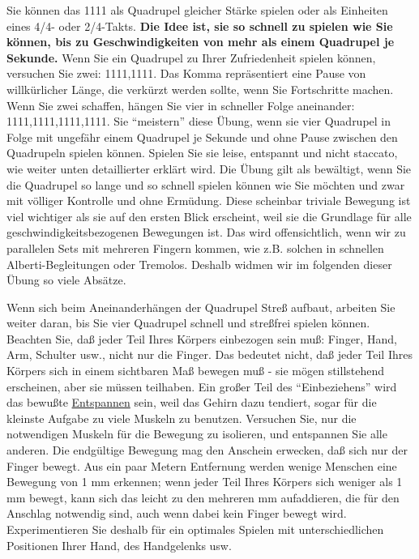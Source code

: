Sie können das 1111 als Quadrupel gleicher Stärke spielen oder als Einheiten eines 4/4- oder 2/4-Takts.
\textbf{Die Idee ist, sie so schnell zu spielen wie Sie können, bis zu Geschwindigkeiten von mehr als einem Quadrupel je Sekunde.}
Wenn Sie ein Quadrupel zu Ihrer Zufriedenheit spielen können, versuchen Sie zwei: 1111,1111.
Das Komma repräsentiert eine Pause von willkürlicher Länge, die verkürzt werden sollte, wenn Sie Fortschritte machen.
Wenn Sie zwei schaffen, hängen Sie vier in schneller Folge aneinander: 1111,1111,1111,1111.
Sie \enquote{meistern} diese Übung, wenn sie vier Quadrupel in Folge mit ungefähr einem Quadrupel je Sekunde und ohne Pause zwischen den Quadrupeln spielen können.
Spielen Sie sie leise, entspannt und nicht staccato, wie weiter unten detaillierter erklärt wird.
Die Übung gilt als bewältigt, wenn Sie die Quadrupel so lange und so schnell spielen können wie Sie möchten und zwar mit völliger Kontrolle und ohne Ermüdung.
Diese scheinbar triviale Bewegung ist viel wichtiger als sie auf den ersten Blick erscheint, weil sie die Grundlage für alle geschwindigkeitsbezogenen Bewegungen ist.
Das wird offensichtlich, wenn wir zu parallelen Sets mit mehreren Fingern kommen, wie z.B. solchen in schnellen Alberti-Begleitungen oder Tremolos.
Deshalb widmen wir im folgenden dieser Übung so viele Absätze.

Wenn sich beim Aneinanderhängen der Quadrupel Streß aufbaut, arbeiten Sie weiter daran, bis Sie vier Quadrupel schnell und streßfrei spielen können.
Beachten Sie, daß jeder Teil Ihres Körpers einbezogen sein muß: Finger, Hand, Arm, Schulter usw., nicht nur die Finger.
Das bedeutet nicht, daß jeder Teil Ihres Körpers sich in einem sichtbaren Maß bewegen muß - sie mögen stillstehend erscheinen, aber sie müssen teilhaben.
Ein großer Teil des \enquote{Einbeziehens} wird das bewußte \hyperref[c1ii14]{Entspannen} sein, weil das Gehirn dazu tendiert, sogar für die kleinste Aufgabe zu viele Muskeln zu benutzen.
Versuchen Sie, nur die notwendigen Muskeln für die Bewegung zu isolieren, und entspannen Sie alle anderen.
Die endgültige Bewegung mag den Anschein erwecken, daß sich nur der Finger bewegt.
Aus ein paar Metern Entfernung werden wenige Menschen eine Bewegung von 1 mm erkennen; wenn jeder Teil Ihres Körpers sich weniger als 1 mm bewegt, kann sich das leicht zu den mehreren mm aufaddieren, die für den Anschlag notwendig sind, auch wenn dabei kein Finger bewegt wird.
Experimentieren Sie deshalb  für ein optimales Spielen mit unterschiedlichen Positionen Ihrer Hand, des Handgelenks usw.

